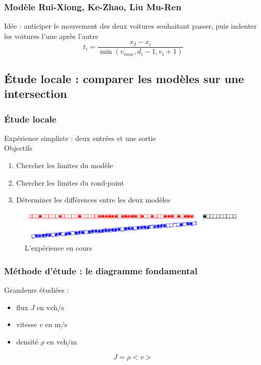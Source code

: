 \documentclass[slidetop,11pt]{beamer}
\begin{document}
	
\begin{frame}
	\frametitle{Modèle Rui-Xiong, Ke-Zhao, Liu Mu-Ren}
	Idée : anticiper le mouvement des deux voitures souhaitant passer, puis indenter les voitures l'une après l'autre
		\begin{equation}
			t_i = \frac{x_I - x_i}{\min(v_{max},d_i-1,v_i+1)}
		\end{equation}
\end{frame}
	\subsection{Étude locale : comparer les modèles sur une intersection}

\begin{frame}
	\frametitle{Étude locale}
	Expérience simpliste : deux entrées et une sortie \\
	Objectifs
	\begin{enumerate}
		\item Chercher les limites du modèle
	 	\item Chercher les limites du rond-point
		\item Déterminer les différences entre les deux modèles
	\end{enumerate}
	\begin{figure}
		\begin{center}
			\includegraphics[scale=0.5]{./images/local}	
		\end{center}
		\caption{L'expérience en cours}
	\end{figure}		
\end{frame}	

\begin{frame}
	\frametitle{Méthode d'étude : le diagramme fondamental}
	Grandeurs étudiées : 
	\begin{itemize}
		\item flux $J \text{ en } \mathrm{veh}/\mathrm{s}$
		\item vitesse $v \text{ en } \mathrm{m}/\mathrm{s}$
		\item densité $\rho \text{ en } \mathrm{veh}/\mathrm{m}$
	\end{itemize}
	$$J = \rho<v>$$
\end{frame}
\end{document}

